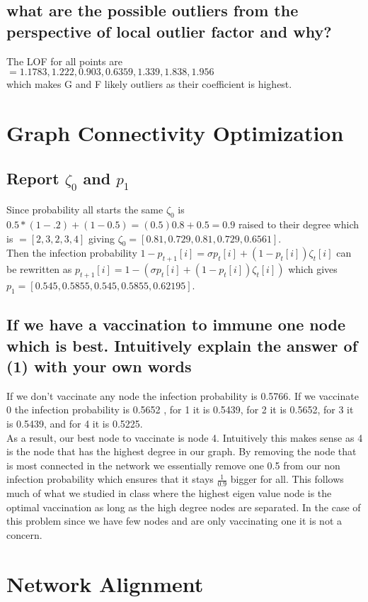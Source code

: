 \documentclass[11pt]{article}
\begin{document}
\subsection{what are the possible outliers from the perspective of local outlier factor and why?}
The LOF for all points are \\$= 1.1783, 1.222, 0.903, 0.6359, 1.339, 1.838, 1.956$ \\ which makes G and F likely outliers as their coefficient is highest.
\section{Graph Connectivity Optimization }
\subsection{Report $\zeta_0$ and $p_1$}
Since probability all starts the same $\zeta_0$ is $0.5*(1-.2)+(1-0.5) = (0.5)0.8 + 0.5 = 0.9$ raised to their degree which is $= [2,3,2,3,4]$ giving $\zeta_0 = [0.81  , 0.729 , 0.81  , 0.729 , 0.6561]$.\\
Then the infection probability $1-p_{t+1}[i] = \sigma p_t[i] + (1-p_t[i])\zeta_t[i]$ can be rewritten as $p_{t+1}[i] = 1-( \sigma p_t[i] + (1-p_t[i])\zeta_t[i])$ which gives 
$p_1= [0.545  , 0.5855 , 0.545  , 0.5855 , 0.62195]$. \\
\subsection{If we have a vaccination to immune one node which is best. Intuitively explain the answer of (1) with your own words}
If we don't vaccinate any node the infection probability is 0.5766. If we vaccinate 0 the infection probability is 0.5652 , for 1 it is 0.5439, for 2 it is 0.5652, for 3 it is 0.5439, and for 4 it is 0.5225. \\
As a result, our best node to vaccinate is node 4. Intuitively this makes sense as 4 is the node that has the highest degree in our graph. By removing the node that is most connected in the network we essentially remove one 0.5 from our non infection probability which ensures that it stays $\frac{1}{0.9}$ bigger for all. This follows much of what we studied in class where the highest eigen value node is the optimal vaccination as long as the high degree nodes are separated. In the case of this problem since we have few nodes and are only vaccinating one it is not a concern.
\section{Network Alignment}
\end{document}
